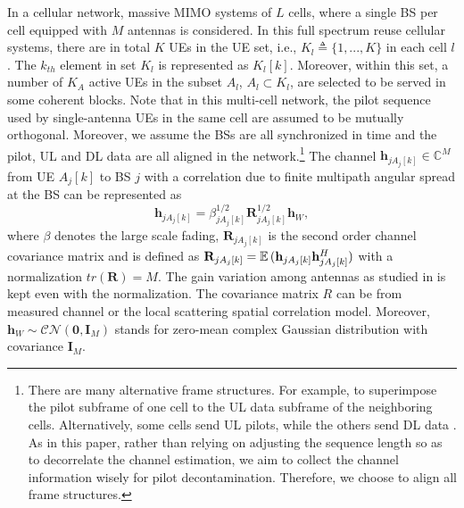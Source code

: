 In a cellular network, massive MIMO systems of $L$ cells, where a single BS per cell equipped 
with $M$ antennas is considered. %
In this full spectrum reuse cellular systems, there are in total $K$ UEs in the UE set, i.e., $K_l\triangleq\{1,...,K\}$ in each cell $l$. The $k_{th}$ element in set $K_l$ is represented as $K_l[k]$. Moreover, within this set, a number of $K_A$ active UEs in the subset $A_l$, $A_l\subset K_l$, are selected to be served in some coherent blocks. Note that in this multi-cell network, the pilot sequence used by single-antenna UEs in the same
cell are assumed to be mutually orthogonal. Moreover, we assume the BSs are all synchronized in time and the pilot, UL and DL data are all aligned in the network.\footnote{There are many alternative frame structures. For example, to superimpose the pilot subframe of one cell to the  UL data subframe of the neighboring cells\cite{upadhya2017superimposed}. Alternatively, some cells send UL pilots, while the others send DL data \cite{fernandes2013inter}. As in this paper, rather than relying on adjusting the sequence length so as to decorrelate the channel estimation, we aim to collect the channel information wisely for pilot decontamination. Therefore, we choose to align all frame structures.} The channel $\mathbf{h}_{jA_j[k]}\in\mathbb{C}^{M}$ from UE $A_j[k]$ to BS $j$ with a correlation due to finite multipath angular spread at the BS  can be represented as
\begin{equation}
\mathbf{h}_{jA_{j}[k]}=\beta^{1/2}_{jA_{j}[k]}\mathbf{R}_{jA_{j}[k]}^{1/2}\mathbf{h}_{W},
\end{equation}
where $\beta$ denotes the large scale fading, $\mathbf{R}_{jA_{j}[k]}$ is the second order channel covariance matrix and is defined as $\mathbf{R}_{jA_j[k]}=\operatorname{\mathbb{E}}{({\mathbf{h}}_{jA_j[k]}{\mathbf{h}}_{jA_j[k]}^H)}$ with a normalization $tr(\mathbf{R})=M$. The gain variation among antennas as studied in\cite{chen2017finite} is kept even with the normalization. The covariance matrix $R$ can be from measured channel or the local scattering spatial correlation model\cite{bjornson2017massive}. Moreover, $\mathbf{h}_{W}\sim \mathcal{CN}\left(\mathbf{0},\mathbf{I}_M\right)$ stands for zero-mean complex Gaussian distribution with covariance $\mathbf{I}_M$. 

